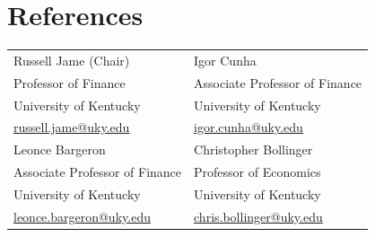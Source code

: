 \documentclass[11pt]{article}
\begin{document}
\section*{References}
\begin{tabularx}{\textwidth}{@{}X X@{}}
Russell Jame (Chair) & Igor Cunha \\
Professor of Finance & Associate Professor of Finance \\
University of Kentucky & University of Kentucky \\
\href{mailto:russell.jame@uky.edu}{russell.jame@uky.edu} & \href{mailto:igor.cunha@uky.edu}{igor.cunha@uky.edu} \\[6pt]
Leonce Bargeron & Christopher Bollinger \\
Associate Professor of Finance & Professor of Economics \\
University of Kentucky & University of Kentucky \\
\href{mailto:leonce.bargeron@uky.edu}{leonce.bargeron@uky.edu} & \href{mailto:chris.bollinger@uky.edu}{chris.bollinger@uky.edu} \\
\end{tabularx}
\end{document}
